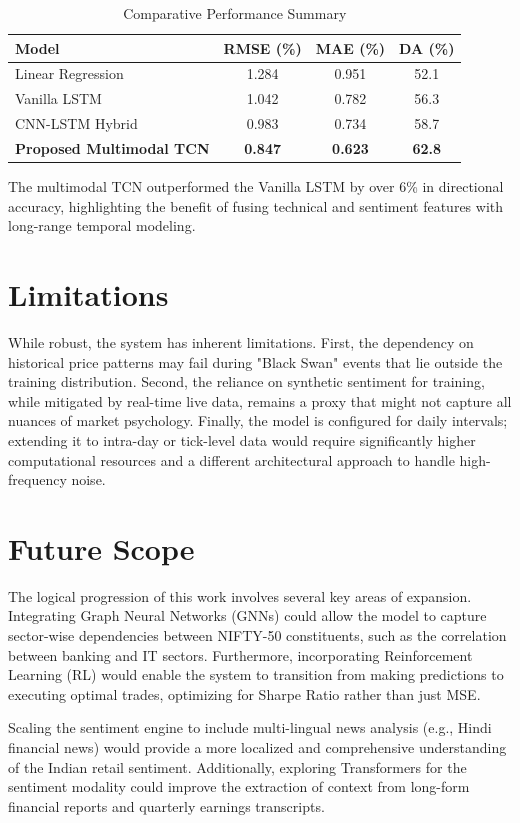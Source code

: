 \documentclass[conference]{IEEEtran}
\begin{document}
\begin{table}[h]
\caption{Comparative Performance Summary}
\label{tab:comparison}
\centering
\begin{tabular}{lccc}
\toprule
\textbf{Model} & \textbf{RMSE (\%)} & \textbf{MAE (\%)} & \textbf{DA (\%)} \\
\midrule
Linear Regression & 1.284 & 0.951 & 52.1 \\
Vanilla LSTM & 1.042 & 0.782 & 56.3 \\
CNN-LSTM Hybrid & 0.983 & 0.734 & 58.7 \\
\textbf{Proposed Multimodal TCN} & \textbf{0.847} & \textbf{0.623} & \textbf{62.8} \\
\bottomrule
\end{tabular}
\end{table}

The multimodal TCN outperformed the Vanilla LSTM by over 6\% in directional accuracy, highlighting the benefit of fusing technical and sentiment features with long-range temporal modeling.

\section{Limitations}
While robust, the system has inherent limitations. First, the dependency on historical price patterns may fail during "Black Swan" events that lie outside the training distribution. Second, the reliance on synthetic sentiment for training, while mitigated by real-time live data, remains a proxy that might not capture all nuances of market psychology. Finally, the model is configured for daily intervals; extending it to intra-day or tick-level data would require significantly higher computational resources and a different architectural approach to handle high-frequency noise.

\section{Future Scope}
The logical progression of this work involves several key areas of expansion. Integrating Graph Neural Networks (GNNs) could allow the model to capture sector-wise dependencies between NIFTY-50 constituents, such as the correlation between banking and IT sectors. Furthermore, incorporating Reinforcement Learning (RL) would enable the system to transition from making predictions to executing optimal trades, optimizing for Sharpe Ratio rather than just MSE. 

Scaling the sentiment engine to include multi-lingual news analysis (e.g., Hindi financial news) would provide a more localized and comprehensive understanding of the Indian retail sentiment. Additionally, exploring Transformers for the sentiment modality could improve the extraction of context from long-form financial reports and quarterly earnings transcripts.
\end{document}
